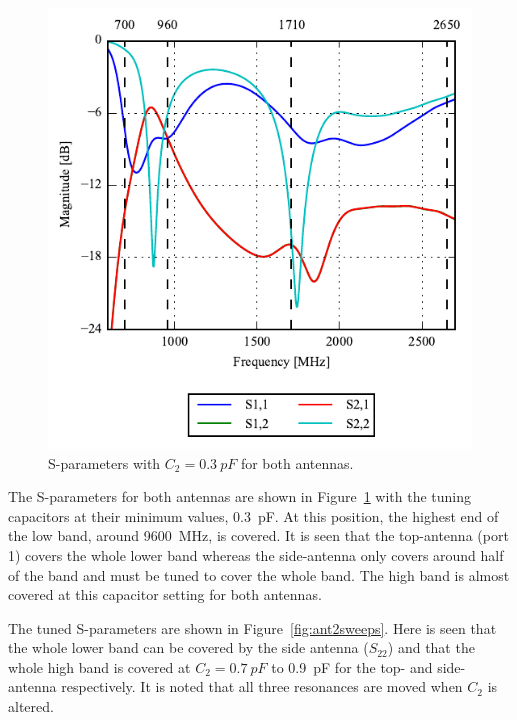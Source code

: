 \begin{figure}[htbp]
    \centering
    \includegraphics{img/tech_sol/trianglefeed/sparams}
    \caption{S-parameters with $C_2=\SI{0.3}{pF}$ for both antennas.}
    \label{fig:ant2sparams}
\end{figure}

The S-parameters for both antennas are shown in Figure~\ref{fig:ant2sparams} with the tuning capacitors at their minimum values, \SI{0.3}{pF}. At this position, the highest end of the low band, around \SI{9600}{MHz}, is covered. It is seen that the top-antenna (port 1) covers the whole lower band whereas the side-antenna only covers around half of the band and must be tuned to cover the whole band. The high band is almost covered at this capacitor setting for both antennas.

The tuned S-parameters are shown in Figure~\ref{fig:ant2sweeps}. Here is seen that the whole lower band can be covered by the side antenna ($S_{22}$) and that the whole high band is covered at $C_2 = \SI{0.7}{pF}$ to \SI{0.9}{pF} for the top- and side-antenna respectively. It is noted that all three resonances are moved when $C_2$ is altered.

